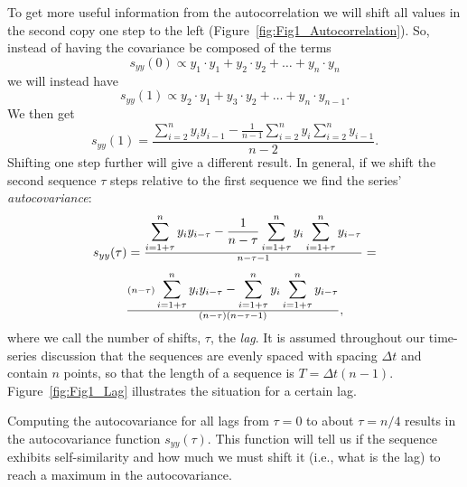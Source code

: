 To get more useful information from the autocorrelation we will shift all values in the second 
copy one step to the left (Figure~\ref{fig:Fig1_Autocorrelation}).  So, instead of having the covariance
be composed of the terms
\begin{equation}
s_{yy}(0) \propto  y_1 \cdot y_1 + y_2 \cdot y_2 + \ldots + y_n \cdot y_n
\end{equation}
we will instead have
\begin{equation}
s_{yy}(1) \propto y_2 \cdot y_1 + y_3 \cdot y_2 + \ldots + y_n \cdot y_{n-1}.
\end{equation}
We then get
\begin{equation}
s_{yy}(1) = \frac{\displaystyle  \sum^n_{i=2} y_i y_{i-1} - \frac{1}{n -1}\displaystyle  \sum^n_{i=2} y_i \sum ^n _{i=2} y_{i- 1}}{n-2}.
\end{equation}
Shifting one step further will give a different result.  In general, if we shift the second sequence 
$\tau$ steps relative to the first sequence we find the series' \emph{autocovariance}:
\begin{equation}
\index{Lag in autocorrelation}
\index{Autocorrelation!lag}
\index{Autocovariance}
\begin{array}{c}
s_{yy}(\tau) = \frac{\displaystyle \sum^n_{i=1 + \tau} y_i y_{i-\tau} -
\frac{1}{n-\tau}
\displaystyle \sum ^n_{i=1 + \tau} y_i \displaystyle \sum^n_{i = 1 + \tau} y_{i-\tau}}{n - \tau - 1} = \\[9pt]
\frac{(n-\tau) \displaystyle \sum ^n_{i=1+\tau} y_i y_{i - \tau} -
\displaystyle \sum^n_{i=1 + \tau} y_i \sum^n_{i = 1 + \tau} y_{i-\tau}}{(n - \tau)(n-\tau - 1)},
\end{array}
\end{equation}
where we call the number of shifts, $\tau$, the \emph{lag}.  It is assumed throughout our time-series 
discussion that the sequences are evenly spaced with spacing $\Delta t$ and contain $n$ points, so that the 
length of a sequence is $T = \Delta t(n-1)$.  Figure~\ref{fig:Fig1_Lag} illustrates the situation for a certain lag.

Computing the autocovariance for all lags from $\tau = 0$ to about $\tau = n/4$ results in
the autocovariance function $s_{yy}(\tau)$.  This function will tell us if the
sequence exhibits self-similarity 
and how much we must shift it (i.e., what is the lag) to reach a maximum in the autocovariance.
 

